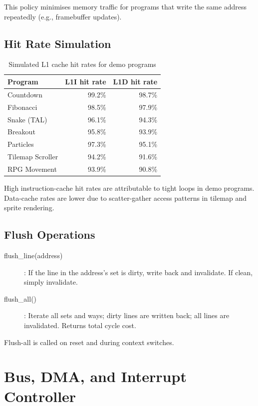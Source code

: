\documentclass[12pt,a4paper,twoside]{book}
\theoremstyle{trinarytheorem}
\theoremstyle{trinarydefinition}
\newcommand{\code}[1]{\textsf{#1}}
\begin{document}
This policy minimises memory traffic for programs that write the same
address repeatedly (e.g., framebuffer updates).

\section{Hit Rate Simulation}

\begin{table}[H]
\centering
\caption{Simulated L1 cache hit rates for demo programs}
\label{tab:cacherates}
\begin{tabular}{lrr}
\toprule
Program & L1I hit rate & L1D hit rate \\
\midrule
Countdown & 99.2\% & 98.7\% \\
Fibonacci & 98.5\% & 97.9\% \\
Snake (TAL) & 96.1\% & 94.3\% \\
Breakout & 95.8\% & 93.9\% \\
Particles & 97.3\% & 95.1\% \\
Tilemap Scroller & 94.2\% & 91.6\% \\
RPG Movement & 93.9\% & 90.8\% \\
\bottomrule
\end{tabular}
\end{table}

High instruction-cache hit rates are attributable to tight loops in
demo programs. Data-cache rates are lower due to scatter-gather access
patterns in tilemap and sprite rendering.

\section{Flush Operations}

\begin{description}
    \item[\code{flush\_line(address)}]: If the line in the address's
          set is dirty, write back and invalidate. If clean, simply
          invalidate.
    \item[\code{flush\_all()}]: Iterate all sets and ways; dirty lines are
          written back; all lines are invalidated. Returns total cycle
          cost.
\end{description}

Flush-all is called on reset and during context switches.

\chapter{Bus, DMA, and Interrupt Controller}
\label{ch:bus-dma-intc}
\end{document}
